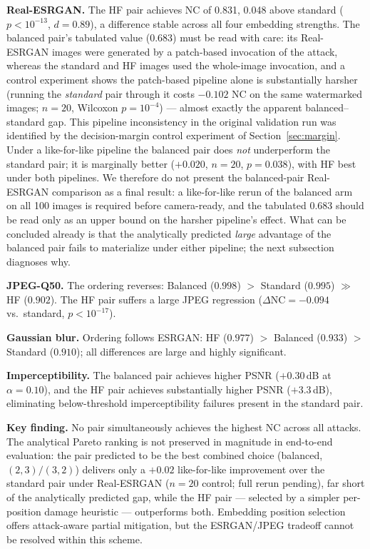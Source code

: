 \documentclass[conference]{IEEEtran}
\begin{document}
\textbf{Real-ESRGAN.} The HF pair achieves NC of 0.831, 0.048 above
standard ($p < 10^{-13}$, $d = 0.89$), a difference stable across all
four embedding strengths. The balanced pair's tabulated value (0.683)
must be read with care: its Real-ESRGAN images were generated by a
patch-based invocation of the attack, whereas the standard and HF images
used the whole-image invocation, and a control experiment shows the
patch-based pipeline alone is substantially harsher (running the
\emph{standard} pair through it costs $-0.102$ NC on the same
watermarked images; $n=20$, Wilcoxon $p=10^{-4}$) --- almost exactly the
apparent balanced--standard gap. This pipeline inconsistency in the
original validation run was identified by the decision-margin control
experiment of Section~\ref{sec:margin}. Under a like-for-like pipeline
the balanced pair does \emph{not} underperform the standard pair; it is
marginally better ($+0.020$, $n=20$, $p=0.038$), with HF best under
both pipelines. We therefore do not present the balanced-pair
Real-ESRGAN comparison as a final result: a like-for-like rerun of the
balanced arm on all 100 images is required before camera-ready, and the
tabulated 0.683 should be read only as an upper bound on the harsher
pipeline's effect. What can be concluded already is that the
analytically predicted \emph{large} advantage of the balanced pair
fails to materialize under either pipeline; the next subsection
diagnoses why.

\textbf{JPEG-Q50.} The ordering reverses: Balanced ($0.998$) $>$ Standard
($0.995$) $\gg$ HF ($0.902$). The HF pair suffers a large JPEG regression
($\Delta\mathrm{NC} = -0.094$ vs.\ standard, $p < 10^{-17}$).

\textbf{Gaussian blur.} Ordering follows ESRGAN: HF ($0.977$) $>$
Balanced ($0.933$) $>$ Standard ($0.910$); all differences are large and
highly significant.

\textbf{Imperceptibility.} The balanced pair achieves higher PSNR
($+0.30$\,dB at $\alpha=0.10$), and the HF pair achieves substantially
higher PSNR ($+3.3$\,dB), eliminating below-threshold imperceptibility
failures present in the standard pair.

\textbf{Key finding.} No pair simultaneously achieves the highest NC
across all attacks. The analytical Pareto ranking is not preserved in
magnitude in end-to-end evaluation: the pair predicted to be the best
combined choice (balanced, $(2,3)/(3,2)$) delivers only a $+0.02$
like-for-like improvement over the standard pair under Real-ESRGAN
($n=20$ control; full rerun pending),
far short of the analytically predicted gap, while the HF pair ---
selected by a simpler per-position damage heuristic --- outperforms
both. Embedding position selection offers attack-aware partial
mitigation, but the ESRGAN/JPEG tradeoff cannot be resolved within this
scheme.
\end{document}
